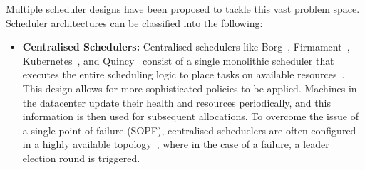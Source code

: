Multiple scheduler designs have been proposed to tackle this vast problem space.
Scheduler architectures can be classified into the following:
\begin{itemize}
    \item \textbf{Centralised Schedulers:} Centralised schedulers like
        Borg~\cite{}, Firmament~\cite{}, Kubernetes~\cite{}, and Quincy~\cite{}
        consist of a single monolithic scheduler that executes the entire
        scheduling logic to place tasks on available resources~\cite{}. This
        design allows for more sophisticated policies to be applied. Machines in
        the datacenter update their health and resources periodically, and this
        information is then used for subsequent allocations. To overcome the
        issue of a single point of failure (SOPF), centralised scheduelers are
        often configured in a highly available topology~\cite{14, 109, 115},
        where in the case of a failure, a leader election round is triggered.


\end{itemize}
